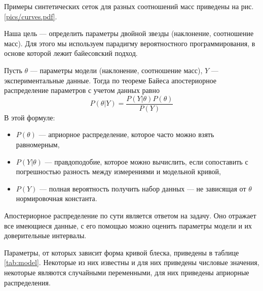 Примеры синтетических сеток для разных соотношений масс приведены на рис. \ref{pics/curves.pdf}.








Наша цель --- определить параметры двойной звезды (наклонение, соотношение масс). Для этого мы используем парадигму вероятностного программирования, в основе которой лежит байесовский подход.

Пусть $\theta$ --- параметры модели (наклонение, соотношение масс), $Y$ --- экспериментальные данные. Тогда по теореме Байеса апостериорное распределение параметров с учетом данных равно
\begin{equation}
P(\theta | Y) = \frac{P(Y | \theta) P(\theta)}{P(Y)}
\label{eq:bayes}
\end{equation}
В этой формуле:
\begin{itemize}
    \item $P(\theta)$ --- априорное распределение, которое часто можно взять равномерным,
    \item $P(Y | \theta)$ --- правдоподобие, которое можно вычислить, если сопоставить с погрешностью разность между измерениями и модельной кривой,
    \item $P(Y)$ --- полная вероятность получить набор данных --- не зависящая от $\theta$ нормировочная константа.
\end{itemize}

Апостериорное распределение по сути является ответом на задачу. Оно отражает все имеющиеся данные, с его помощью можно оценить параметры модели и их доверительные интервалы.



Параметры, от которых зависит форма кривой блеска, приведены в таблице \ref{tab:model}. Некоторые из них известны и для них приведены числовые значения, некоторые являются случайными переменными, для них приведены априорные распределения.

